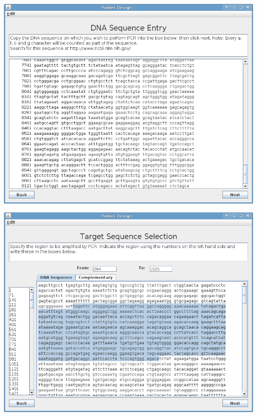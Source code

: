 \begin{frame}
  \includegraphics[width=\textwidth]{./img/currentBuild/sequenceEntry.png}
\end{frame}

\begin{frame}
  \includegraphics[width=\textwidth]{./img/currentBuild/areaSelection.png}
\end{frame}

